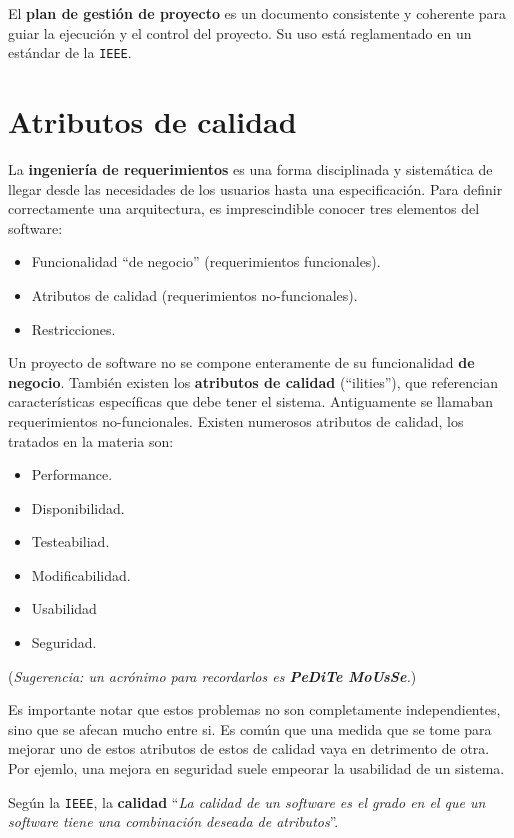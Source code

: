 \documentclass[]{article}
\begin{document}
El \textbf{plan de gestión de proyecto} es un documento consistente y coherente para guiar la ejecución y el control del proyecto. Su uso está reglamentado en un estándar de la \texttt{IEEE}.


\newpage

\section{Atributos de calidad}
La \textbf{ingeniería de requerimientos} es una forma disciplinada y sistemática de llegar desde las necesidades de los usuarios hasta una especificación. Para definir correctamente una arquitectura, es imprescindible conocer tres elementos del software:
\begin{itemize}
	\item Funcionalidad ``de negocio'' (requerimientos funcionales).
	\item Atributos de calidad (requerimientos no-funcionales).
	\item Restricciones.
\end{itemize}

Un proyecto de software no se compone enteramente de su funcionalidad \textbf{de negocio}. También existen los \textbf{atributos de calidad} (``ilities''), que referencian características específicas que debe tener el sistema. Antiguamente se llamaban requerimientos no-funcionales. Existen numerosos atributos de calidad, los tratados en la materia son:

\begin{itemize}
	\item Performance.
	\item Disponibilidad.
	\item Testeabiliad.
	\item Modificabilidad.
	\item Usabilidad
	\item Seguridad.
\end{itemize}

(\emph{Sugerencia: un acrónimo para recordarlos es \textbf{PeDiTe MoUsSe}.})

Es importante notar que estos problemas no son completamente independientes, sino que se afecan mucho entre si. Es común que una medida que se tome para mejorar uno de estos atributos de estos de calidad vaya en detrimento de otra. Por ejemlo, una mejora en seguridad suele empeorar la usabilidad de un sistema.

Según la \texttt{IEEE}, la \textbf{calidad} ``\emph{La calidad de un software es el grado en el que un software tiene una combinación deseada de atributos}''.
\end{document}
